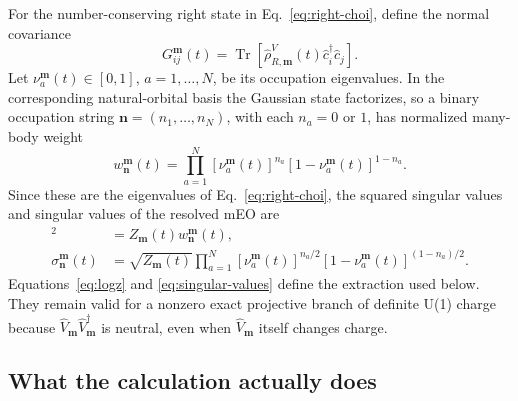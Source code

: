 \documentclass[aps,prb,twocolumn,floatfix,nofootinbib,superscriptaddress]{revtex4-2}
\newcommand{\Tr}{\operatorname{Tr}}
\begin{document}
For the number-conserving right state in Eq.~\eqref{eq:right-choi}, define the normal covariance
\begin{equation}
 G_{ij}^{\boldsymbol m}(t)
 =\Tr\!\left[
 \hat\rho^V_{R,\boldsymbol m}(t)\hat c_i^{\dagger}\hat c_j
 \right].
 \label{eq:normal-covariance}
\end{equation}
Let \(\nu_a^{\boldsymbol m}(t)\in[0,1]\), \(a=1,\ldots,N\), be its occupation eigenvalues.  In the corresponding natural-orbital basis the Gaussian state factorizes, so a binary occupation string \(\bm n=(n_1,\ldots,n_N)\), with each \(n_a=0\) or \(1\), has normalized many-body weight
\begin{equation}
 w_{\bm n}^{\boldsymbol m}(t)
 =\prod_{a=1}^{N}
 [\nu_a^{\boldsymbol m}(t)]^{n_a}
 [1-\nu_a^{\boldsymbol m}(t)]^{1-n_a}.
 \label{eq:fock-products}
\end{equation}
Since these are the eigenvalues of Eq.~\eqref{eq:right-choi}, the squared singular values and singular values of the resolved mEO are
\begin{align}
 [\sigma_{\bm n}^{\boldsymbol m}(t)]^2
 &=Z_{\boldsymbol m}(t)w_{\bm n}^{\boldsymbol m}(t),
 \label{eq:squared-singular-values}\\
 \sigma_{\bm n}^{\boldsymbol m}(t)
 &=\sqrt{Z_{\boldsymbol m}(t)}
 \prod_{a=1}^{N}
 [\nu_a^{\boldsymbol m}(t)]^{n_a/2}
 [1-\nu_a^{\boldsymbol m}(t)]^{(1-n_a)/2}.
 \label{eq:singular-values}
\end{align}
Equations~\eqref{eq:logz} and \eqref{eq:singular-values} define the extraction used below.  They remain valid for a nonzero exact projective branch of definite U(1) charge because \(\hat V_{\boldsymbol m}\hat V_{\boldsymbol m}^{\dagger}\) is neutral, even when \(\hat V_{\boldsymbol m}\) itself changes charge.

\subsection{What the calculation actually does}
\end{document}
